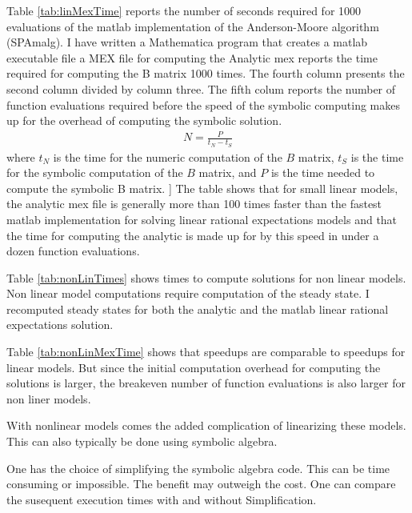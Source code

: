 \documentclass{beamer}
\begin{document}
\begin{frame}
%

Table \ref{tab:linMexTime} reports the number of seconds required for 1000 evaluations of
the matlab implementation of the Anderson-Moore algorithm (SPAmalg).
I have written a Mathematica program that creates a matlab executable file
a MEX file for computing the
Analytic mex reports the time required for computing the B matrix 1000 times.
The fourth column presents  the second column  divided by column three.
The fifth colum reports 
the number of function evaluations required before the speed of the
symbolic computing makes up for the overhead of
computing the symbolic solution.
\begin{gather*}
  N=\frac{P}{t_N-t_S}
\end{gather*}
where $t_N$ is the time for the numeric computation of the $B$ matrix,
$t_S$ is the time for the symbolic computation of the $B$ matrix, and
$P$ is the time needed to compute the symbolic B matrix.
]
The table shows that for small linear models, 
the analytic mex file is generally more than 100 times
faster than the fastest matlab implementation for solving linear rational
expectations models and that the time for computing the analytic is
made up for by this speed in under a dozen function evaluations.


%


Table \ref{tab:nonLinTimes} shows times to compute solutions for non linear
models. Non linear model computations require computation of the steady state.
I recomputed steady states for both the analytic and the matlab linear 
rational expectations solution.



%

Table \ref{tab:nonLinMexTime} shows that
speedups are comparable to speedups for linear models. But since the 
initial computation overhead for computing the solutions is larger, the
breakeven number of function evaluations is also larger for non liner models.

    
With nonlinear models comes the added complication of linearizing these models.
This can also typically be done using symbolic algebra.

One has the choice of simplifying the symbolic algebra code. This can be
time consuming or impossible.  The benefit may outweigh the cost.
One can compare the susequent execution times with and without Simplification.


%

    
  \end{frame}
\end{document}
